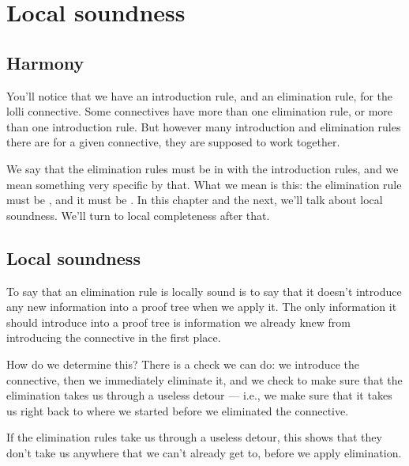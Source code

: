 \documentclass[../../../main.tex]{subfiles}
\begin{document}
\chapter{Local soundness}


\section{Harmony}

You'll notice that we have an introduction rule, and an elimination rule, for the lolli connective. Some connectives have more than one elimination rule, or more than one introduction rule. But however many introduction and elimination rules there are for a given connective, they are supposed to work together. 

We say that the elimination rules must be in  with the introduction rules, and we mean something very specific by that. What we mean is this: the elimination rule must be , and it must be . In this chapter and the next, we'll talk about local soundness. We'll turn to local completeness after that.


\section{Local soundness}

To say that an elimination rule is locally sound is to say that it doesn't introduce any new information into a proof tree when we apply it. The only information it should introduce into a proof tree is information we already knew from introducing the connective in the first place.

How do we determine this? There is a check we can do: we introduce the connective, then we immediately eliminate it, and we check to make sure that the elimination takes us through a useless detour --- i.e., we make sure that it takes us right back to where we started before we eliminated the connective. 

If the elimination rules take us through a useless detour, this shows that they don't take us anywhere that we can't already get to, before we apply elimination.


\end{document}
